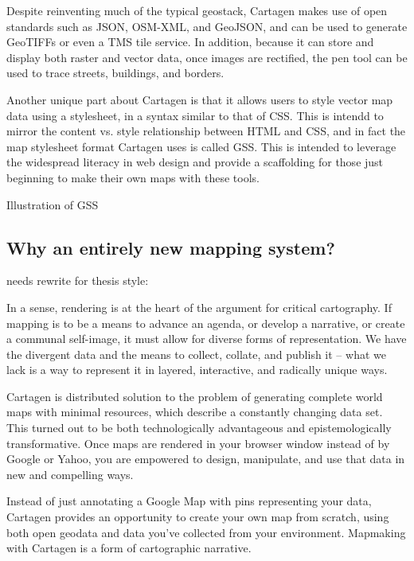 \documentclass[11pt]{report}
\begin{document}

Despite reinventing much of the typical geostack, Cartagen makes use of open standards such as JSON, OSM-XML, and GeoJSON, and can be used to generate \ac{GeoTIFF}s or even a \ac{TMS} tile service. In addition, because it can store and display both raster and vector data, once images are rectified, the pen tool can be used to trace streets, buildings, and borders.   

Another unique part about Cartagen is that it allows users to style vector map data using a stylesheet, in a syntax similar to that of CSS. This is intendd to mirror the content vs. style relationship between HTML and CSS, and in fact the map stylesheet format Cartagen uses is called GSS. This is intended to leverage the widespread literacy in web design and provide a scaffolding for those just beginning to make their own maps with these tools. 

Illustration of GSS

\subsection{Why an entirely new mapping system?}

needs rewrite for thesis style:

In a sense, rendering is at the heart of the argument for critical cartography. If mapping is to be a means to advance an agenda, or develop a narrative, or create a communal self-image, it must allow for diverse forms of representation. We have the divergent data and the means to collect, collate, and publish it – what we lack is a way to represent it in layered, interactive, and radically unique ways. 

Cartagen is distributed solution to the problem of generating complete world maps with minimal resources, which describe a constantly changing data set. This turned out to be both technologically advantageous and epistemologically transformative. Once maps are rendered in your browser window instead of by Google or Yahoo, you are empowered to design, manipulate, and use that data in new and compelling ways. 

Instead of just annotating a Google Map with pins representing your data, Cartagen provides an opportunity to create your own map from scratch, using both open geodata and data you've collected from your environment. Mapmaking with Cartagen is a form of cartographic narrative. 
\end{document}
